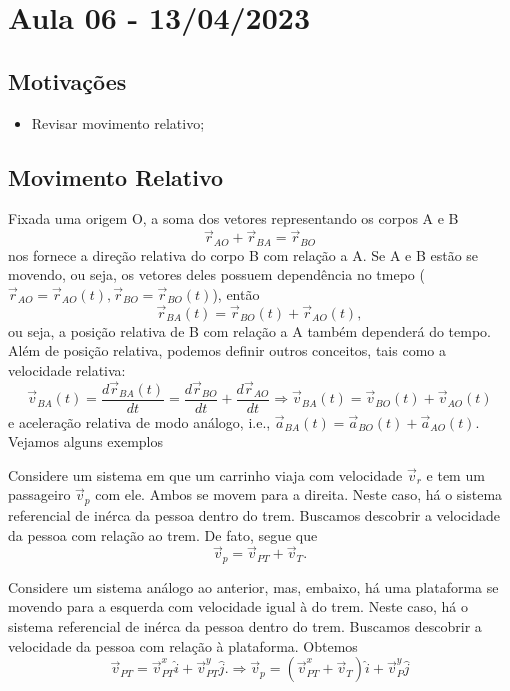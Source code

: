 \documentclass[PhysicsI/physics_notes.tex]{subfiles}
\begin{document}
\section{Aula 06 - 13/04/2023}
\subsection{Motivações}
\begin{itemize}
	\item Revisar movimento relativo;
\end{itemize}

\subsection{Movimento Relativo}
Fixada uma origem O, a soma dos vetores representando os corpos A e B
$$
	\vec{r}_{AO} + \vec{r}_{BA} = \vec{r}_{BO}
$$
nos fornece a direção relativa do corpo B com relação a A. Se A e B estão se movendo, ou seja, os vetores deles
possuem dependência no tmepo ($\vec{r}_{AO} = \vec{r}_{AO}(t), \vec{r}_{BO} = \vec{r}_{BO}(t)$), então
$$
	\vec{r}_{BA}(t) = \vec{r}_{BO}(t) + \vec{r}_{AO}(t),
$$
ou seja, a posição relativa de B com relação a A também dependerá do tempo. Além de posição relativa,
podemos definir outros conceitos, tais como a velocidade relativa:
$$
	\vec{v}_{BA}(t) = \frac{d \vec{r}_{BA}(t)}{dt} = \frac{d \vec{r}_{BO}}{dt} + \frac{d \vec{r}_{AO}}{dt} \Rightarrow \vec{v}_{BA}(t) = \vec{v}_{BO}(t)  + \vec{v}_{AO}(t)
$$
e aceleração relativa de modo análogo, i.e., $\vec{a}_{BA}(t) = \vec{a}_{BO}(t) + \vec{a}_{AO}(t).$ Vejamos alguns exemplos
\begin{example}
	Considere um sistema em que um carrinho viaja com velocidade $\vec{v}_{r}$ e tem um passageiro $\vec{v}_{p}$ com ele.
	Ambos se movem para a direita.
	Neste caso, há o sistema referencial de inérca da pessoa dentro do trem. Buscamos descobrir a velocidade da pessoa com relação ao trem.
	De fato, segue que
	$$
		\vec{v}_{p} = \vec{v}_{PT} + \vec{v}_{T}.
	$$
\end{example}
\begin{example}
	Considere um sistema análogo ao anterior, mas, embaixo, há uma plataforma se movendo para a esquerda com velocidade igual à do trem.
	Neste caso, há o sistema referencial de inérca da pessoa dentro do trem. Buscamos descobrir a velocidade da pessoa com relação
	à plataforma. Obtemos
	$$
		\vec{v}_{PT} = \vec{v}_{PT}^{x}\hat{i} + \vec{v}_{PT}^{y}\hat{j}. \Rightarrow \vec{v}_{p} = (\vec{v}_{PT}^{x} + \vec{v}_{T})\hat{i} + \vec{v}_{P}^{y}\hat{j}
	$$
\end{example}
\end{document}
